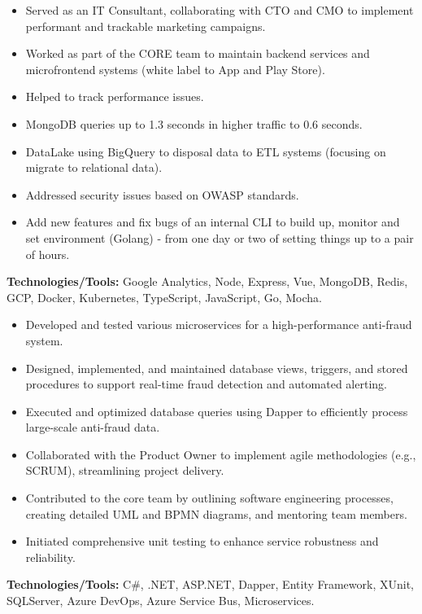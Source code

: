 \documentclass[10pt,a4paper]{altacv}
\begin{document}
\begin{itemize}
    \setlength{\itemindent}{0.5em}
    \item[--] Served as an IT Consultant, collaborating with CTO and CMO to implement performant and trackable marketing campaigns.
    \item[--] Worked as part of the CORE team to maintain backend services and microfrontend systems (white label to App and Play Store).
    \item[--] Helped to track performance issues.
    \item[--] MongoDB queries up to 1.3 seconds in higher traffic to 0.6 seconds.
    \item[--] DataLake using BigQuery to disposal data to ETL systems (focusing on migrate to relational data).
    \item[--] Addressed security issues based on OWASP standards.
    \item[--] Add new features and fix bugs of an internal CLI to build up, monitor and set environment (Golang) - from one day or two of setting things up to a pair of hours.
\end{itemize}
\textbf{Technologies/Tools:} Google Analytics, Node, Express, Vue, MongoDB, Redis, GCP, Docker, Kubernetes, TypeScript, JavaScript, Go, Mocha.
\vspace{5mm}


\begin{itemize}
    \setlength{\itemindent}{0.5em}
    \item[--] Developed and tested various microservices for a high-performance anti-fraud system.
    \item[--] Designed, implemented, and maintained database views, triggers, and stored procedures to support real-time fraud detection and automated alerting.
    \item[--] Executed and optimized database queries using Dapper to efficiently process large-scale anti-fraud data.
    \item[--] Collaborated with the Product Owner to implement agile methodologies (e.g., SCRUM), streamlining project delivery.
    \item[--] Contributed to the core team by outlining software engineering processes, creating detailed UML and BPMN diagrams, and mentoring team members.
    \item[--] Initiated comprehensive unit testing to enhance service robustness and reliability.
\end{itemize}
\textbf{Technologies/Tools:} C\#, .NET, ASP.NET, Dapper, Entity Framework, XUnit, SQLServer, Azure DevOps, Azure Service Bus, Microservices.
\vspace{5mm}
\end{document}
